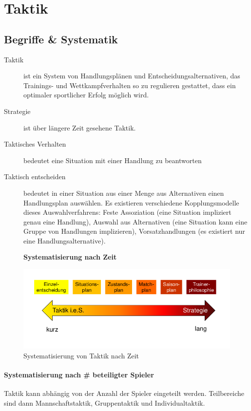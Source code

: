 \section{Taktik}

\subsection{Begriffe \& Systematik}
\begin{description}
  \item[Taktik] ist ein System von Handlungsplänen und Entscheidungsalternativen, das Trainings- und Wettkampfverhalten so zu regulieren gestattet, dass ein optimaler sportlicher Erfolg möglich wird.
  \item[Strategie] ist über längere Zeit gesehene Taktik.
  \item[Taktisches Verhalten] bedeutet eine Situation mit einer Handlung zu beantworten
  \item[Taktisch entscheiden] bedeutet in einer Situation aus einer Menge aus Alternativen einen Handlungsplan auswählen. Es existieren verschiedene Kopplungsmodelle dieses Auswahlverfahrens: Feste Assoziation (eine Situation impliziert genau eine Handlung), Auswahl aus Alternativen (eine Situation kann eine Gruppe von Handlungen implizieren), Vorsatzhandlungen (es existiert nur eine Handlungsalternative).
\end{description}
\begin{figure}[H]
  \begin{flushleft}
    \textbf{Systematisierung nach Zeit}
  \end{flushleft}
  \centering
  \includegraphics[width=.7\textwidth]{pictures/taktik_systematisierung.png}
  \caption{Systematisierung von Taktik nach Zeit}
\end{figure}
\paragraph{Systematisierung nach \# beteiligter Spieler} Taktik kann abhängig von der Anzahl der Spieler eingeteilt werden. Teilbereiche sind dann Mannschaftstaktik, Gruppentaktik und Individualtaktik.

